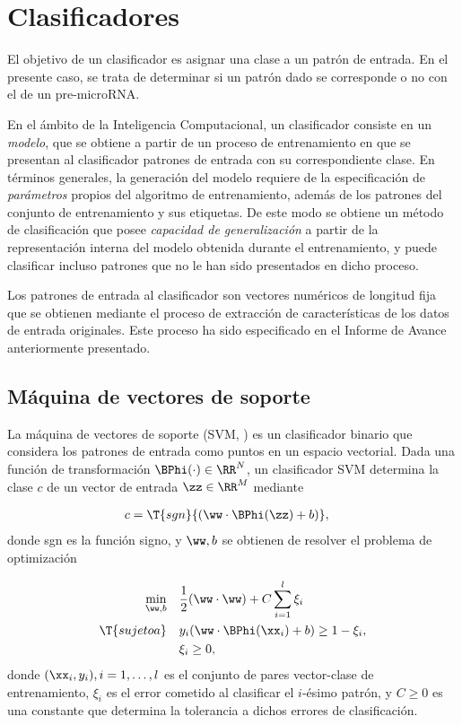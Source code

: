 \section{Clasificadores}
El objetivo de un clasificador es asignar una clase a un patrón de
entrada. En el presente caso, se trata de determinar si un patrón dado
se corresponde o no con el de un pre-microRNA.

En el ámbito de la Inteligencia Computacional, un clasificador
consiste en un \emph{modelo}, que se obtiene a partir de un proceso de
entrenamiento en que se presentan al clasificador patrones de entrada
con su correspondiente clase. En términos generales, la generación del
modelo requiere de la especificación de \emph{parámetros} propios del
algoritmo de entrenamiento, además de los patrones del conjunto de
entrenamiento y sus etiquetas. De este modo se obtiene un método de
clasificación que posee \emph{capacidad de generalización} a partir de
la representación interna del modelo obtenida durante el
entrenamiento, y puede clasificar incluso patrones que no le han sido
presentados en dicho proceso.

Los patrones de entrada al clasificador son vectores numéricos de
longitud fija que se obtienen mediante el proceso de extracción de
características de los datos de entrada originales. Este proceso ha
sido especificado en el Informe de Avance anteriormente presentado.

\subsection{Máquina de vectores de soporte}
La máquina de vectores de soporte (SVM, )
\cite{svm} es un clasificador binario que considera los patrones de
entrada como puntos en un espacio vectorial. Dada una función de transformación
$\BPhi(\cdot)\in{}\RR^N$, un clasificador SVM determina la clase $c$ de
un vector de entrada $\zz\in\RR^M$ mediante

\begin{align}
  c &= \T{sgn}{\left(\ww\cdot\BPhi(\zz)+b\right)},
\end{align}
donde sgn es la función signo, y $\ww,b$ se obtienen de resolver el
problema de optimización

\begin{align}
  \min_{\ww,b} &\quad
  \frac{1}{2}(\ww\cdot\ww)+C\sum_{i=1}^{l}\xi_i\\
  \T{sujeto a} &\quad
  y_i(\ww\cdot\BPhi(\xx_i)+b)\geq 1-\xi_i,\\
  &\quad\xi_i\geq 0,
\end{align}
donde $(\xx_i,y_i), i=1,\ldots,l$ es el conjunto de pares
vector-clase de entrenamiento, $\xi_i$ es el error cometido al
clasificar el $i$-ésimo patrón, y $C\geq0$ es una constante que
determina la tolerancia a dichos errores de clasificación.

